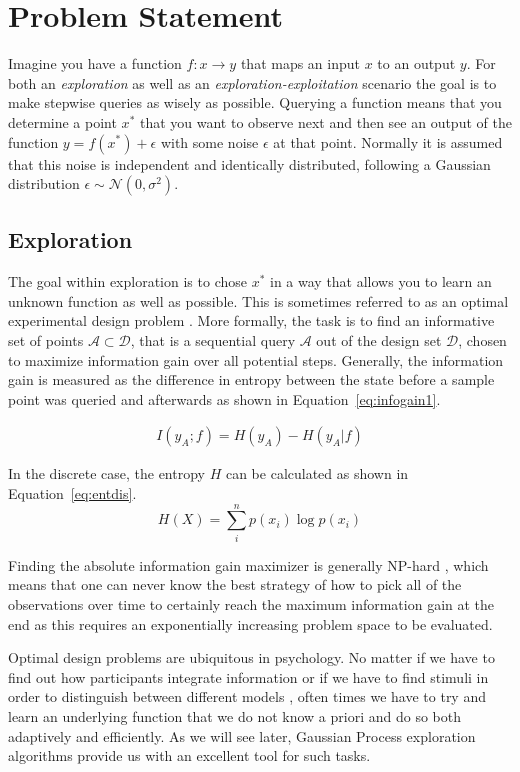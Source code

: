 \documentclass[authoryear,11pt,review]{elsarticle}
\begin{document}
\section{Problem Statement}
Imagine you have a function $f: x \rightarrow y$ that maps an input $x$ to an output $y$. For both an \emph{exploration} as well as an \emph{exploration-exploitation} scenario the goal is to make stepwise queries as wisely as possible. Querying a function means that you determine a point $x^*$ that you want to observe next and then see an output of the function $y=f(x^*)+\epsilon$ with some noise $\epsilon$ at that point. Normally it is assumed that this noise is independent and identically distributed, following a Gaussian distribution $\epsilon \sim \mathcal{N}(0,\sigma^2)$.

\subsection{Exploration}
The goal within exploration is to chose $x^*$ in a way that allows you to learn an unknown function as well as possible. This is sometimes referred to as an optimal experimental design problem \citep{goos2011optimal}. More formally, the task is to find an informative set of points $\mathcal{A} \subset \mathcal{D}$, that is a sequential query $\mathcal{A}$ out of the design set $\mathcal{D}$, chosen to maximize information gain over all potential steps. Generally, the information gain is measured as the difference in entropy between the state before a sample point was queried and afterwards as shown in Equation~\ref{eq:infogain1}.

\begin{align}
\label{eq:infogain1}
 I(y_{A};f)=H(y_{A})-H(y_{A}|f)
\end{align}

In the discrete case, the entropy $H$ can be calculated as shown in Equation~\ref{eq:entdis}.
\begin{equation*}
\label{eq:entdis}
H(X)=\sum_i^n p(x_i) \log p(x_i)
\end{equation*}

Finding the absolute information gain maximizer is generally NP-hard \citep{ko1995exact}, which means that one can never know the best strategy of how to pick all of the observations over time to certainly reach the maximum information gain at the end as this requires an exponentially increasing problem space to be evaluated. 

Optimal design problems are ubiquitous in psychology. No matter if we have to find out how participants integrate information \citep{borji2013bayesian} or if we have to find stimuli in order to distinguish between different models \citep{cavagnaro2010adaptive}, often times we have to try and learn an underlying function that we do not know a priori and do so both adaptively and efficiently. As we will see later, Gaussian Process exploration algorithms provide us with an excellent tool for such tasks.
\end{document}
